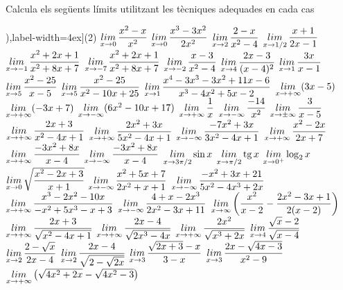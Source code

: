 \begin{mylist}
	\exer[1] Calcula els següents límits utilitzant les tècniques adequades en cada cas

\begin{tasks}[counter-format=(tsk[1]),label-width=4ex](2)
\task $\mathop{lim}\limits_{x\to 0 } \dfrac{x^2-x}{x^2}$
\task $\mathop{lim}\limits_{x\to 0 } \dfrac{x^3-3x^2}{2x^2}$
\task $\mathop{lim}\limits_{x\to 2 } \dfrac{2-x}{x^2-4}$
\task $\mathop{lim}\limits_{x\to 1/2 } \dfrac{x+1}{2x-1}$
\task $\mathop{lim}\limits_{x\to -1 } \dfrac{x^2+2x+1}{x^2+8x+7}$
\task $\mathop{lim}\limits_{x\to -7} \dfrac{x^2+2x+1}{x^2+8x+7}$
\task $\mathop{lim}\limits_{x\to -2 } \dfrac{x-3}{x^2-4}$
\task $\mathop{lim}\limits_{x\to 4 } \dfrac{2x-3}{(x-4)^2}$
\task $\mathop{lim}\limits_{x\to 1 } \dfrac{3x}{x-1}$
\task $\mathop{lim}\limits_{x\to 5 } \dfrac{x^2-25}{x-5}$
\task $\mathop{lim}\limits_{x\to 5 } \dfrac{x^2-25}{x^2-10x+25}$
\task $\mathop{lim}\limits_{x\to 1 } \dfrac{x^4-3x^3-3x^2+11x-6}{x^3-4x^2+5x-2}$
\task $\mathop{lim}\limits_{x\to +\infty } (3x-5)$
\task $\mathop{lim}\limits_{x\to +\infty } (-3x+7)$
\task $\mathop{lim}\limits_{x\to -\infty } (6x^2-10x+17)$
\task $\mathop{lim}\limits_{x\to +\infty } \dfrac{1}{x}$
\task $\mathop{lim}\limits_{x\to -\infty } \dfrac{-14}{x^2}$
\task $\mathop{lim}\limits_{x\to \pm\infty } \dfrac{3}{x-5}$
\task $\mathop{lim}\limits_{x\to +\infty } \dfrac{2x+3}{x^2-4x+1}$
\task $\mathop{lim}\limits_{x\to +\infty } \dfrac{2x^2+3x}{5x^2-4x+1}$
\task $\mathop{lim}\limits_{x\to -\infty } \dfrac{-7x^2+3x}{3x^2-4x+1}$
\task $\mathop{lim}\limits_{x\to +\infty } \dfrac{x^2-2x}{2x+7}$
\task $\mathop{lim}\limits_{x\to +\infty } \dfrac{-3x^2+8x}{x-4}$
\task $\mathop{lim}\limits_{x\to -\infty } \dfrac{-3x^2+8x}{x-4}$
\task $\mathop{lim}\limits_{x\to 3\pi /2 } \sin x$
\task $\mathop{lim}\limits_{x\to \pi /2 } \mathrm{tg}\, x$
\task $\mathop{lim}\limits_{x\to 0^+} \log_2 x$
\task $\mathop{lim}\limits_{x\to 0 } \sqrt{\dfrac{x^2-2x+3}{x+1}}$
\task $\mathop{lim}\limits_{x\to -\infty } \dfrac{x^2+5x+7}{2x^2+x+1}$
\task $\mathop{lim}\limits_{x\to -\infty } \dfrac{-x^2+3x+21}{5x^2-4x^3+2x}$
\task $\mathop{lim}\limits_{x\to +\infty } \dfrac{x^3-2x^2-10x}{-x^2+5x^3-x+3}$
\task $\mathop{lim}\limits_{x\to -\infty } \dfrac{4+x-2x^3}{2x^2-3x+11}$
\task $\mathop{lim}\limits_{x\to \infty } \left( \dfrac{x^2}{x-2} - \dfrac{2x^2-3x+1}{2(x-2)} \right)$
\task $\mathop{lim}\limits_{x\to +\infty } \dfrac{2x+3}{\sqrt{x^2-4x+1}}$
\task $\mathop{lim}\limits_{x\to +\infty } \dfrac{2x-4}{\sqrt{2x^3-4x}}$
\task $\mathop{lim}\limits_{x\to +\infty } \dfrac{2x^2}{\sqrt{x^3+2x}}$
\task $\mathop{lim}\limits_{x\to 4 } \dfrac{\sqrt{x}-2}{\sqrt{x-4}}$
\task $\mathop{lim}\limits_{x\to 2 } \dfrac{2-\sqrt{x}}{2x-4}$
\task $\mathop{lim}\limits_{x\to 2 } \dfrac{2x-4}{\sqrt{2-\sqrt{2x}}}$
\task $\mathop{lim}\limits_{x\to 3 } \dfrac{\sqrt{2x+3}-x}{3-x}$
\task $\mathop{lim}\limits_{x\to 3 } \dfrac{2x-\sqrt{4x-3}}{x^2-9}$
\task $\mathop{lim}\limits_{x\to +\infty } \left( \sqrt{4x^2+2x} - \sqrt{4x^2-3} \right)$
\end{tasks}
\end{mylist}
